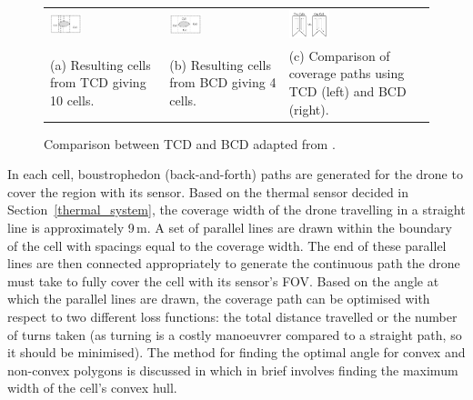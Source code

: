 \begin{figure}[h!]
    \centering
    \begin{tabular}{p{}p{}p{}}
        \includegraphics[width=0.3\textwidth]{figs/Jihwan/choset_tcd.pdf} &
        \includegraphics[width=0.3\textwidth]{figs/Jihwan/choset_bcd.pdf} &
        \includegraphics[width=0.3\textwidth]{figs/Jihwan/choset_bcd_tcd_comparison.pdf} \\
        \centering (a) Resulting cells from \gls{TCD} giving 10 cells. & 
        \centering (b) Resulting cells from \gls{BCD} giving 4 cells. & 
        \centering (c) Comparison of coverage paths using \gls{TCD} (left) and \gls{BCD} (right).
    \end{tabular}
    \caption[Comparison between TCD and BCD]
    {Comparison between \gls{TCD} and \gls{BCD} adapted from \cite{choset1998bcd}.}
    \label{fig:msp_choset}
\end{figure}

In each cell, boustrophedon (back-and-forth) paths are generated for the drone to cover the region with its sensor. Based on the thermal sensor decided in Section~\ref{thermal_system}, the coverage width of the drone travelling in a straight line is approximately 9\,m. A set of parallel lines are drawn within the boundary of the cell with spacings equal to the coverage width. The end of these parallel lines are then connected appropriately to generate the continuous path the drone must take to fully cover the cell with its sensor's \gls{FOV}. Based on the angle at which the parallel lines are drawn, the coverage path can be optimised with respect to two different loss functions: the total distance travelled or the number of turns taken (as turning is a costly manoeuvrer compared to a straight path, so it should be minimised). The method for finding the optimal angle for convex and non-convex polygons is discussed in \cite{torres2016cpp} which in brief involves finding the maximum width of the cell's convex hull. 

